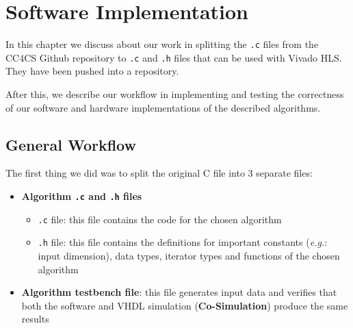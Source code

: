 \chapter{Software Implementation}
\label{chapter:software}
In this chapter we discuss about our work in splitting the \texttt{.c} files from the CC4CS Github repository\cite{cc4cs_git} to \texttt{.c} and \texttt{.h} files that can be used with Vivado HLS. They have been pushed into a repository\cite{repo_our_files}.

After this, we describe our workflow in implementing and testing the correctness of our software and hardware implementations of the described algorithms.

\section{General Workflow}

The first thing we did was to split the original C file into 3 separate files:

\begin{itemize}[noitemsep]
	\item \textbf{Algorithm \texttt{.c} and \texttt{.h} files}
	\begin{itemize}[noitemsep]
		\item \texttt{.c} file: this file contains the code for the chosen algorithm
		\item \texttt{.h} file: this file contains the definitions for important constants (\textit{e.g.}: input dimension), data types, iterator types and functions of the chosen algorithm
	\end{itemize}
	\item \textbf{Algorithm testbench file}: this file generates input data and verifies that both the software and VHDL simulation (\textbf{Co-Simulation}) produce the same results
\end{itemize}


